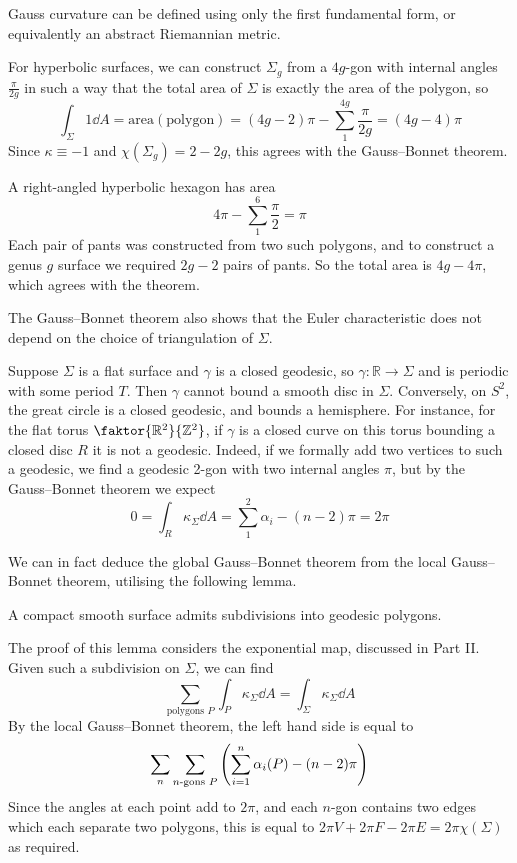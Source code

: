 \begin{remark}
	Gauss curvature can be defined using only the first fundamental form, or equivalently an abstract Riemannian metric.

	For hyperbolic surfaces, we can construct \( \Sigma_g \) from a \( 4g \)-gon with internal angles \( \frac{\pi}{2g} \) in such a way that the total area of \( \Sigma \) is exactly the area of the polygon, so
	\[
		\int_\Sigma 1 \dd{A} = \mathrm{area}(\mathrm{polygon}) = (4g-2)\pi - \sum_{1}^{4g} \frac{\pi}{2g} = (4g-4)\pi
	\]
	Since \( \kappa \equiv -1 \) and \( \chi(\Sigma_g) = 2-2g \), this agrees with the Gauss--Bonnet theorem.

	A right-angled hyperbolic hexagon has area
	\[
		4\pi - \sum_{1}^6 \frac{\pi}{2} = \pi
	\]
	Each pair of pants was constructed from two such polygons, and to construct a genus \( g \) surface we required \( 2g-2 \) pairs of pants.
	So the total area is \( 4g-4\pi \), which agrees with the theorem.

	The Gauss--Bonnet theorem also shows that the Euler characteristic does not depend on the choice of triangulation of \( \Sigma \).

	Suppose \( \Sigma \) is a flat surface and \( \gamma \) is a closed geodesic, so \( \gamma \colon \mathbb R \to \Sigma \) and is periodic with some period \( T \).
	Then \( \gamma \) cannot bound a smooth disc in \( \Sigma \).
	Conversely, on \( S^2 \), the great circle is a closed geodesic, and bounds a hemisphere.
	For instance, for the flat torus \( \faktor{\mathbb R^2}{\mathbb Z^2} \), if \( \gamma \) is a closed curve on this torus bounding a closed disc \( R \) it is not a geodesic.
	Indeed, if we formally add two vertices to such a geodesic, we find a geodesic 2-gon with two internal angles \( \pi \), but by the Gauss--Bonnet theorem we expect
	\[
		0 = \int_R \kappa_\Sigma \dd{A} = \sum_1^2 \alpha_i - (n-2)\pi = 2\pi
	\]
\end{remark}
We can in fact deduce the global Gauss--Bonnet theorem from the local Gauss--Bonnet theorem, utilising the following lemma.
\begin{lemma}
	A compact smooth surface admits subdivisions into geodesic polygons.
\end{lemma}
The proof of this lemma considers the exponential map, discussed in Part II.
Given such a subdivision on \( \Sigma \), we can find
\[
	\sum_{\text{polygons } P} \int_P \kappa_\Sigma \dd{A} = \int_\Sigma \kappa_\Sigma \dd{A}
\]
By the local Gauss--Bonnet theorem, the left hand side is equal to
\[
	\sum_n \sum_{n\text{-gons } P} \qty(\sum_{i=1}^n \alpha_i(P) - (n-2)\pi)
\]
Since the angles at each point add to \( 2\pi \), and each \( n \)-gon contains two edges which each separate two polygons, this is equal to \( 2\pi V + 2 \pi F - 2\pi E = 2\pi\chi(\Sigma) \) as required.

